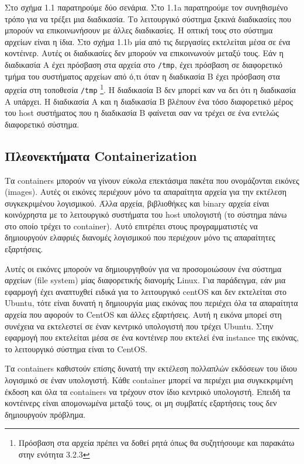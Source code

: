 Στο σχήμα 1.1 παρατηρούμε δύο σενάρια. Στο 1.1a παρατηρούμε τον συνηθισμένο
τρόπο για να τρέξει μια διαδικασία. Το λειτουργικό σύστημα ξεκινά διαδικασίες
που μπορούν να επικοινωνήσουν με άλλες διαδικασίες. Η οπτική τους στο σύστημα
αρχείων είναι η ίδια. Στο σχήμα 1.1b μία από τις διεργασίες εκτελείται μέσα σε
ένα κοντέινερ. Αυτές οι διαδικασίες δεν μπορούν να επικοινωνούν μεταξύ τους. Εάν
η διαδικασία Α έχει πρόσβαση στα αρχεία στο  \texttt{\textlatin{/tmp}}, έχει
πρόσβαση σε διαφορετικό τμήμα του συστήματος αρχείων από ό,τι όταν η διαδικασία
Β έχει πρόσβαση στα αρχεία στη τοποθεσία \texttt{\textlatin{/tmp}} 
\footnote{Πρόσβαση στα αρχεία πρέπει να δοθεί ρητά όπως θα συζητήσουμε και
παρακάτω στην ενότητα 3.2.3}.
Η διαδικασία Β δεν μπορεί καν να δει ότι η διαδικασία Α υπάρχει.
Η διαδικασία Α και η διαδικασία Β βλέπουν ένα τόσο διαφορετικό μέρος του
\textlatin{host} συστήματος που η διαδικασία Β φαίνεται σαν να τρέχει σε ένα
εντελώς διαφορετικό σύστημα.

\subsection{Πλεονεκτήματα \textlatin{Containerization}}

Τα \textlatin{containers} μπορούν να γίνουν εύκολα επεκτάσιμα πακέτα
που ονομάζονται εικόνες (\textlatin{images}).
Αυτές οι εικόνες περιέχουν μόνο τα απαραίτητα αρχεία για την εκτέλεση
συγκεκριμένου λογισμικού. Άλλα αρχεία, βιβλιοθήκες και \textlatin{binary}
αρχεία είναι κοινόχρηστα με το λειτουργικό συστήματα του
\textlatin{host} υπολογιστή (το σύστημα πάνω στο οποίο τρέχει το
\textlatin{container}). Αυτό επιτρέπει στους προγραμματιστές
να δημιουργούν ελαφριές διανομές λογισμικού που περιέχουν μόνο
τις απαραίτητες εξαρτήσεις.


Αυτές οι εικόνες μπορούν να δημιουργηθούν για να προσομοιώσουν ένα σύστημα
αρχείων (\textlatin{file system})
μίας διαφορετικής διανομής \textlatin{Linux}. Για παράδειγμα, εάν μια
εφαρμογή έχει αναπτυχθεί ειδικά για το λειτουργικό \textlatin{centOS} και
δεν εκτελείται στο \textlatin{Ubuntu}, τότε είναι δυνατή η
δημιουργία μιας εικόνας που περιέχει όλα τα απαραίτητα αρχεία που αφορούν το
\textlatin{CentOS} και άλλες εξαρτήσεις. Αυτή η εικόνα μπορεί στη συνέχεια να εκτελεστεί
σε έναν κεντρικό υπολογιστή που τρέχει \textlatin{Ubuntu}. Στην εφαρμογή που
εκτελείται μέσα σε ένα κοντέινερ που εκτελεί ένα \textlatin{instance} της
εικόνας, το λειτουργικό σύστημα είναι το \textlatin{CentOS}.

Τα \textlatin{containers} καθιστούν επίσης δυνατή την εκτέλεση πολλαπλών
εκδόσεων του ίδιου λογισμικό σε έναν υπολογιστή.
Κάθε \textlatin{container} μπορεί να
περιέχει μια συγκεκριμένη έκδοση και όλα τα \textlatin{containers} να τρέχουν
στον ίδιο κεντρικό υπολογιστή. Επειδή τα κοντέινερς είναι απομονωμένα μεταξύ τους,
οι μη συμβατές εξαρτήσεις τους δεν δημιουργούν πρόβλημα. \\



